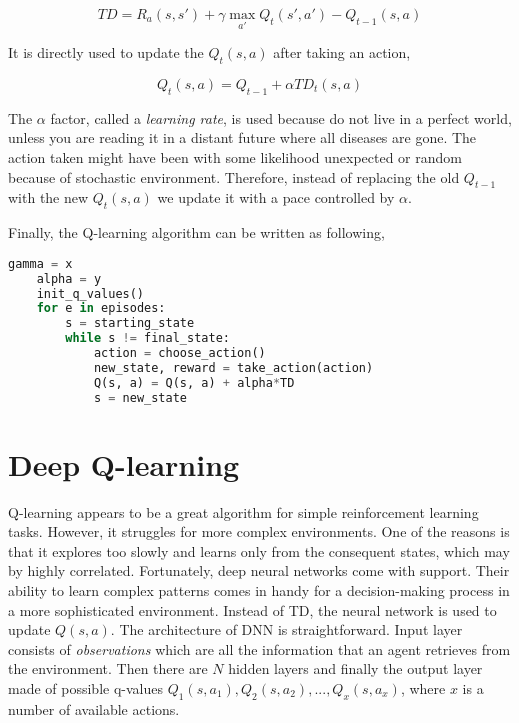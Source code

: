 \begin{equation}
    TD = R_a(s, s') + \gamma \max_{a'} Q_{t}(s', a') - Q_{t-1}(s, a)
\label{eq:temporal-difference}
\end{equation}

It is directly used to update the $Q_t(s, a)$ after taking an action,

\begin{equation}
    Q_t(s, a) = Q_{t-1} + \alpha TD_t(s, a)
\end{equation}

The $\alpha$ factor, called a \emph{learning rate}, is used because do not live in a perfect world, unless you are reading it in a distant future where all diseases are gone. The action taken might have been with some likelihood unexpected or random because of stochastic environment. Therefore, instead of replacing the old $Q_{t-1}$ with the new $Q_t(s, a)$ we update it with a pace controlled by $\alpha$.

\vspace{.5cm}

Finally, the Q-learning algorithm can be written as following,

\begin{lstlisting}[language=Python]
    gamma = x
    alpha = y
    init_q_values()
    for e in episodes:
        s = starting_state
        while s != final_state:
            action = choose_action()
            new_state, reward = take_action(action)
            Q(s, a) = Q(s, a) + alpha*TD
            s = new_state
\end{lstlisting}

\newpage

\section{Deep Q-learning}
\label{sec:deep-q-learn}

Q-learning appears to be a great algorithm for simple reinforcement learning tasks. However, it struggles for more complex environments. One of the reasons is that it explores too slowly and learns only from the consequent states, which may by highly correlated. Fortunately, deep neural networks come with support. Their ability to learn complex patterns comes in handy for a decision-making process in a more sophisticated environment. Instead of TD, the neural network is used to update $Q(s, a)$. The architecture of DNN is straightforward. Input layer consists of \emph{observations} which are all the information that an agent retrieves from the environment. Then there are $N$ hidden layers and finally the output layer made of possible q-values $Q_1(s, a_1), Q_2(s, a_2), ..., Q_x(s, a_x)$, where $x$ is a number of available actions.

